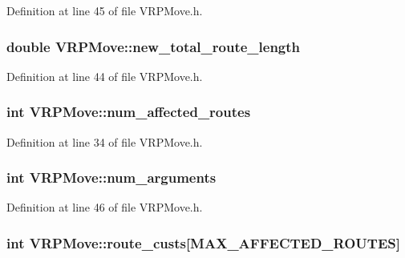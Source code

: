 Definition at line 45 of file VRPMove.h.

\hypertarget{class_v_r_p_move_a4000655bc1ea3c24788b8a3aa1a33153}{
\subsubsection[{new\_\-total\_\-route\_\-length}]{\setlength{\rightskip}{0pt plus 5cm}double {\bf VRPMove::new\_\-total\_\-route\_\-length}}}
\label{class_v_r_p_move_a4000655bc1ea3c24788b8a3aa1a33153}


Definition at line 44 of file VRPMove.h.

\hypertarget{class_v_r_p_move_abf5a4ac08176a9fb85bd5ebf7ef1e1ee}{
\subsubsection[{num\_\-affected\_\-routes}]{\setlength{\rightskip}{0pt plus 5cm}int {\bf VRPMove::num\_\-affected\_\-routes}}}
\label{class_v_r_p_move_abf5a4ac08176a9fb85bd5ebf7ef1e1ee}


Definition at line 34 of file VRPMove.h.

\hypertarget{class_v_r_p_move_a2873c7ab303640f54785f8d9d705df98}{
\subsubsection[{num\_\-arguments}]{\setlength{\rightskip}{0pt plus 5cm}int {\bf VRPMove::num\_\-arguments}}}
\label{class_v_r_p_move_a2873c7ab303640f54785f8d9d705df98}


Definition at line 46 of file VRPMove.h.

\hypertarget{class_v_r_p_move_abba2be357b8d777d3f72119b87839c55}{
\subsubsection[{route\_\-custs}]{\setlength{\rightskip}{0pt plus 5cm}int {\bf VRPMove::route\_\-custs}\mbox{[}MAX\_\-AFFECTED\_\-ROUTES\mbox{]}}}
\label{class_v_r_p_move_abba2be357b8d777d3f72119b87839c55}


